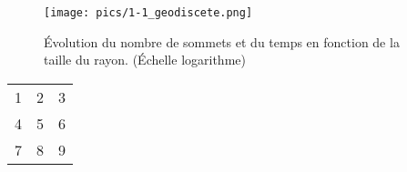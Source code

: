 \begin{figure}[h!]
\centering
   \texttt{[image: pics/1-1\_geodiscete.png]}
\caption{Évolution du nombre de sommets et du temps en fonction de la taille du rayon. (Échelle logarithme)}
\end{figure}


\begin{tabular}{| l || c | r | }
 \hline                 
   1 & 2 & 3 \\
   4 & 5 & 6 \\
   7 & 8 & 9 \\
 \hline  
 \end{tabular}



